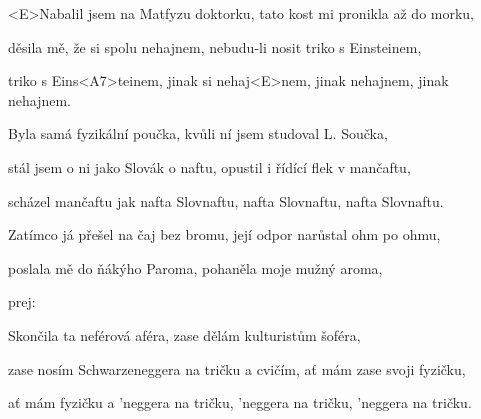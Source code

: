 

\zs
<E>Nabalil jsem na Matfyzu doktorku,
tato kost mi pronikla až do morku,

děsila mě, že si spolu nehajnem,
nebudu-li nosit triko s Einsteinem,

triko s Eins<A7>teinem, jinak si nehaj<E>nem,
jinak nehajnem, jinak nehajnem.
\ks

\zs
Byla samá fyzikální poučka,
kvůli ní jsem studoval L. Součka,

stál jsem o ni jako Slovák o naftu,
opustil i řídící flek v mančaftu,

scházel mančaftu jak nafta Slovnaftu,
nafta Slovnaftu, nafta Slovnaftu.
\ks

\zs
Zatímco já přešel na čaj bez bromu,
její odpor narůstal ohm po ohmu,

poslala mě do ňákýho Paroma,
pohaněla moje mužný aroma,

prej: 
\ks

\zs
Skončila ta neférová aféra,
zase dělám kulturistům šoféra,

zase nosím Schwarzeneggera na tričku
a cvičím, ať mám zase svoji fyzičku,

ať mám fyzičku a 'neggera na tričku,
'neggera na tričku, 'neggera na tričku.
\ks

\kp























